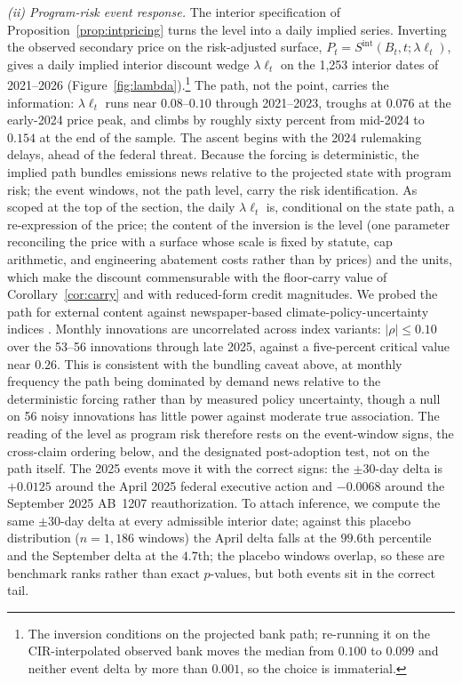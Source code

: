\documentclass[11pt,letterpaper]{article}
\theoremstyle{plain}
\theoremstyle{definition}
\numberwithin{equation}{section}
\begin{document}
\emph{(ii) Program-risk event response.} The interior specification of Proposition~\ref{prop:intpricing} turns the level into a daily implied series. Inverting the observed secondary price on the risk-adjusted surface, $P_t=S^{\mathrm{int}}(B_t,t;\lambda\ell_t)$, gives a daily implied interior discount wedge $\lambda\ell_t$ on the 1{,}253 interior dates of 2021--2026 (Figure~\ref{fig:lambda}).\footnote{The inversion conditions on the projected bank path; re-running it on the CIR-interpolated observed bank moves the median from $0.100$ to $0.099$ and neither event delta by more than $0.001$, so the choice is immaterial.} The path, not the point, carries the information: $\lambda\ell_t$ runs near $0.08$--$0.10$ through 2021--2023, troughs at $0.076$ at the early-2024 price peak, and climbs by roughly sixty percent from mid-2024 to $0.154$ at the end of the sample. The ascent begins with the 2024 rulemaking delays, ahead of the federal threat. Because the forcing is deterministic, the implied path bundles emissions news relative to the projected state with program risk; the event windows, not the path level, carry the risk identification. As scoped at the top of the section, the daily $\lambda\ell_t$ is, conditional on the state path, a re-expression of the price; the content of the inversion is the level (one parameter reconciling the price with a surface whose scale is fixed by statute, cap arithmetic, and engineering abatement costs rather than by prices) and the units, which make the discount commensurable with the floor-carry value of Corollary~\ref{cor:carry} and with reduced-form credit magnitudes. We probed the path for external content against newspaper-based climate-policy-uncertainty indices \citep{gavriilidis2021}. Monthly innovations are uncorrelated across index variants: $|\rho|\le0.10$ over the 53--56 innovations through late 2025, against a five-percent critical value near $0.26$. This is consistent with the bundling caveat above, at monthly frequency the path being dominated by demand news relative to the deterministic forcing rather than by measured policy uncertainty, though a null on 56 noisy innovations has little power against moderate true association. The reading of the level as program risk therefore rests on the event-window signs, the cross-claim ordering below, and the designated post-adoption test, not on the path itself. The 2025 events move it with the correct signs: the $\pm30$-day delta is $+0.0125$ around the April 2025 federal executive action and $-0.0068$ around the September 2025 AB~1207 reauthorization. To attach inference, we compute the same $\pm30$-day delta at every admissible interior date; against this placebo distribution ($n=1{,}186$ windows) the April delta falls at the $99.6$th percentile and the September delta at the $4.7$th; the placebo windows overlap, so these are benchmark ranks rather than exact $p$-values, but both events sit in the correct tail.
\end{document}
